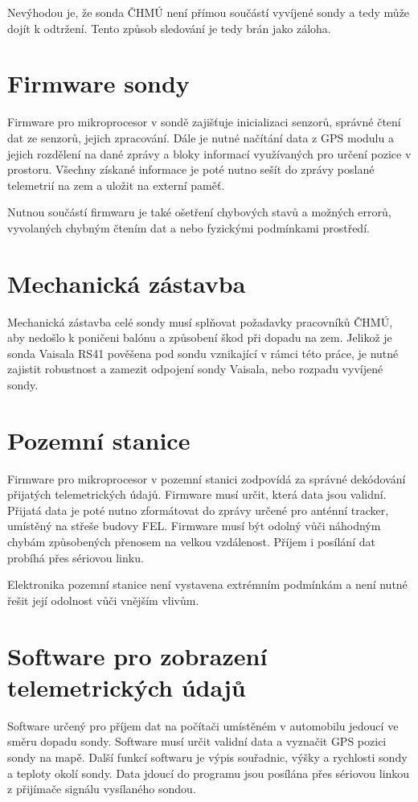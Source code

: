\documentclass[twoside]{ctuthesis}
\theoremstyle{plain}
\theoremstyle{definition}
\theoremstyle{note}
\begin{document}
			Nevýhodou je, že sonda ČHMÚ není přímou součástí vyvíjené sondy a tedy může dojít k odtržení. Tento způsob sledování je tedy brán jako záloha.


		
	\section{Firmware sondy}
	Firmware pro mikroprocesor v sondě zajišťuje inicializaci senzorů, správné čtení dat ze senzorů, jejich zpracování. Dále je nutné načítání data z GPS modulu a jejich rozdělení na dané zprávy a bloky informací využívaných pro určení pozice v prostoru. Všechny získané informace je poté nutno sešít do zprávy poslané telemetrií na zem a uložit na externí paměť. 

	Nutnou součástí firmwaru je také ošetření chybových stavů a možných errorů, vyvolaných chybným čtením dat a nebo fyzickými podmínkami prostředí.

	\section{Mechanická zástavba}
	Mechanická zástavba celé sondy musí splňovat požadavky pracovníků ČHMÚ, aby nedošlo k poničeni balónu a způsobení škod při dopadu na zem. Jelikož je sonda Vaisala RS41 pověšena pod sondu vznikající v rámci této práce, je nutné zajistit robustnost a zamezit odpojení sondy Vaisala, nebo rozpadu vyvíjené sondy.



	\section{Pozemní stanice}
	\label{sec:navrh:pozemni_stanice}
	Firmware pro mikroprocesor v pozemní stanici zodpovídá za správné dekódování přijatých telemetrických údajů. Firmware musí určit, která data jsou validní. Přijatá data je poté nutno zformátovat do zprávy určené pro anténní tracker, umístěný na střeše budovy FEL. Firmware musí být odolný vůči náhodným chybám způsobených přenosem na velkou vzdálenost. Příjem i posílání dat probíhá přes sériovou linku. 

	Elektronika pozemní stanice není vystavena extrémním podmínkám a není nutné řešit její odolnost vůči vnějším vlivům. 
	

	\section{Software pro zobrazení telemetrických údajů}
	Software určený pro příjem dat na počítači umístěném v automobilu jedoucí ve směru dopadu sondy. Software musí určit validní data a vyznačit GPS pozici sondy na mapě. Další funkcí softwaru je výpis souřadnic, výšky a rychlosti sondy a teploty okolí sondy. Data jdoucí do programu jsou posílána přes sériovou linkou z přijímače signálu vysílaného sondou. 
\end{document}
